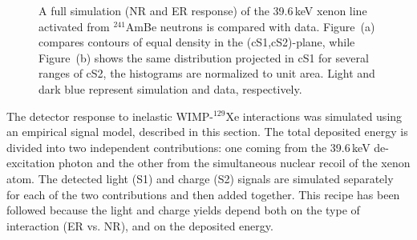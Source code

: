\begin{figure}[t!]
	\caption{A full simulation {\ale (NR and ER response)} of the 39.6\,keV  xenon line activated from $^{241}$AmBe neutrons is compared with  data.
		 Figure~(a) compares contours of equal density in the (cS1,cS2)-plane, while Figure~(b) shows the same distribution projected in cS1 for
		 several ranges of cS2, the histograms are normalized to unit area. Light and dark blue represent simulation and data, respectively.
		}
		
  \label{fig:mc_comp}
\end{figure}

The detector response to inelastic WIMP-$^{129}$Xe interactions was simulated using an empirical signal model, described in this section.
The total deposited energy is divided into two independent contributions: one coming from the 39.6\,keV de-excitation photon and the other  from  
the simultaneous nuclear recoil of the xenon atom. The detected light (S1) and charge (S2) signals are simulated separately for each of the two contributions 
and then added together. This recipe has been followed  because the light and charge yields depend both on the type of interaction (ER vs. NR), and on the deposited energy.


